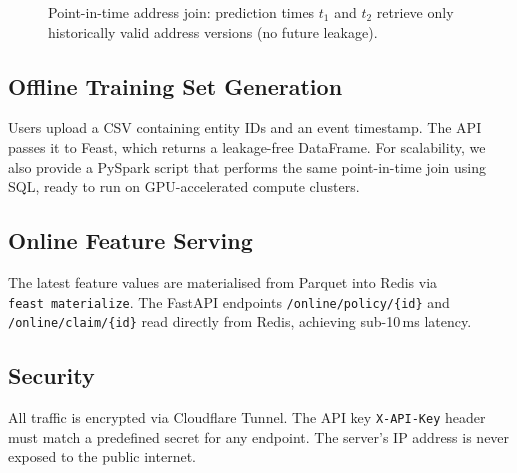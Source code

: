 \documentclass[11pt,a4paper]{article}
\begin{document}
\begin{figure}[ht]
\centering
{}
\caption{Point-in-time address join: prediction times $t_1$ and $t_2$ retrieve only historically valid address versions (no future leakage).}
\label{fig:pit}
\end{figure}

\subsection{Offline Training Set Generation}
Users upload a CSV containing entity IDs and an event timestamp.
The API passes it to Feast, which returns a leakage-free DataFrame.
For scalability, we also provide a PySpark script that performs the same point-in-time join using SQL, ready to run on GPU-accelerated compute clusters.

\subsection{Online Feature Serving}
The latest feature values are materialised from Parquet into Redis via
\texttt{feast~materialize}.
The FastAPI endpoints \texttt{/online/policy/\{id\}} and
\texttt{/online/claim/\{id\}} read directly from Redis, achieving sub-10\,ms latency.

\subsection{Security}
All traffic is encrypted via Cloudflare Tunnel.
The API key \texttt{X-API-Key} header must match a predefined secret for any endpoint.
The server's IP address is never exposed to the public internet.
\end{document}
